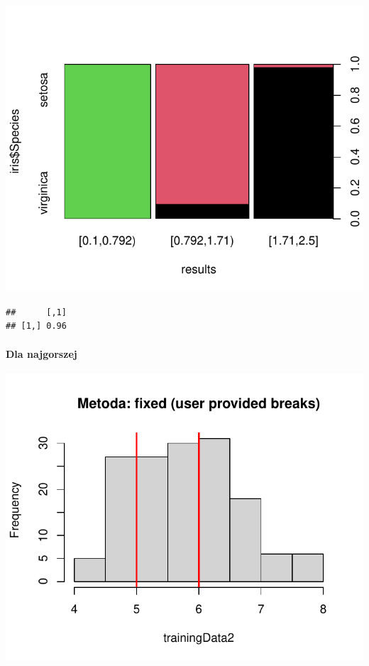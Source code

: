 \documentclass[
  12pt,
]{article}
\begin{document}
\begin{center}\includegraphics{Sprawozdanie2_files/figure-latex/tabela_kondygnacji_4_najl-1} \end{center}

\begin{verbatim}
##      [,1]
## [1,] 0.96
\end{verbatim}

\paragraph{Dla najgorszej}\label{dla-najgorszej-3}

\begin{center}\includegraphics{Sprawozdanie2_files/figure-latex/givenRanges_najg-1} \end{center}
\end{document}
